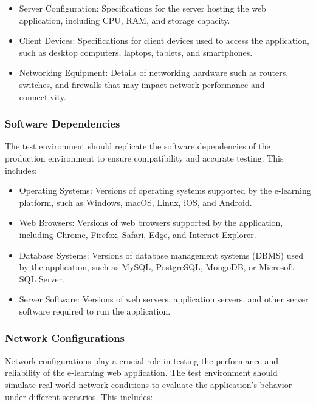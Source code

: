 		\begin{itemize}
			\item Server Configuration: Specifications for the server hosting the web application, including CPU, RAM, and storage capacity.
			\item Client Devices: Specifications for client devices used to access the application, such as desktop computers, laptops, tablets, and smartphones.
			\item Networking Equipment: Details of networking hardware such as routers, switches, and firewalls that may impact network performance and connectivity.
		\end{itemize}
		
		\subsubsection{Software Dependencies}
		
		The test environment should replicate the software dependencies of the production environment to ensure compatibility and accurate testing. This includes:
		
		\begin{itemize}
			\item Operating Systems: Versions of operating systems supported by the e-learning platform, such as Windows, macOS, Linux, iOS, and Android.
			\item Web Browsers: Versions of web browsers supported by the application, including Chrome, Firefox, Safari, Edge, and Internet Explorer.
			\item Database Systems: Versions of database management systems (DBMS) used by the application, such as MySQL, PostgreSQL, MongoDB, or Microsoft SQL Server.
			\item Server Software: Versions of web servers, application servers, and other server software required to run the application.
		\end{itemize}
		
		\subsubsection{Network Configurations}
		
		Network configurations play a crucial role in testing the performance and reliability of the e-learning web application. The test environment should simulate real-world network conditions to evaluate the application's behavior under different scenarios. This includes:
		
